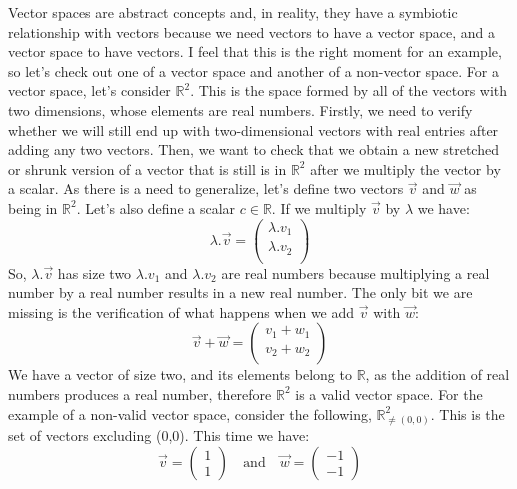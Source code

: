 \documentclass[a4,12pt,twosided,openany]{memoir}
\begin{document}
\par 
\indent
Vector spaces are abstract concepts and, in reality, they have a symbiotic relationship with vectors because we need vectors to have a vector space, and a vector space to have vectors. I feel that this is the right moment for an example, so let’s check out one of a vector space and another of a non-vector space. For a vector space, let’s consider $\mathbb{R}^2$. This is the space formed by all of the vectors with two dimensions, whose elements are real numbers. Firstly, we need to verify whether we will still end up with two-dimensional vectors with real entries after adding any two vectors. Then, we want to check that we obtain a new stretched or shrunk version of a vector that is still is in $\mathbb{R}^2$ after we multiply the vector by a scalar. As there is a need to generalize, let’s define two vectors  $\overrightarrow{v}$ and $\overrightarrow{w}$ as being in $\mathbb{R}^2$. Let’s also define a scalar $c \in \mathbb{R}$. If we multiply  $\overrightarrow{v}$ by $\lambda$ we have:
\[\lambda.\overrightarrow{v}  = \begin{pmatrix}
 \lambda.v_1\\
 \lambda.v_2\\
\end{pmatrix}
\]
So, $\lambda.\overrightarrow{v}$ has size two $\lambda.v_1$ and $\lambda.v_2$ are real numbers because multiplying a real number by a real number results in a new real number. The only bit we are missing is the verification of what happens when we add $\overrightarrow{v}$ with $\overrightarrow{w}$:
\[
\overrightarrow{v} + \overrightarrow{w} = \begin{pmatrix}
 v_1 + w_1\\
 v_2 + w_2\\
\end{pmatrix}
\]
We have a vector of size two, and its elements belong to $\mathbb{R}$, as the addition of real numbers produces a real number, therefore $\mathbb{R}^2$ is a valid vector space. For the example of a non-valid vector space, consider the following, $\mathbb R^2_{\ne (0,0)}$. This is the set of vectors excluding (0,0). This time we have:
 \[\overrightarrow{v}  = \begin{pmatrix}
 1\\
 1
\end{pmatrix}  \quad \textrm{and} \quad \overrightarrow{w} = \begin{pmatrix}
 -1\\
 -1
\end{pmatrix}  \]
\end{document}
